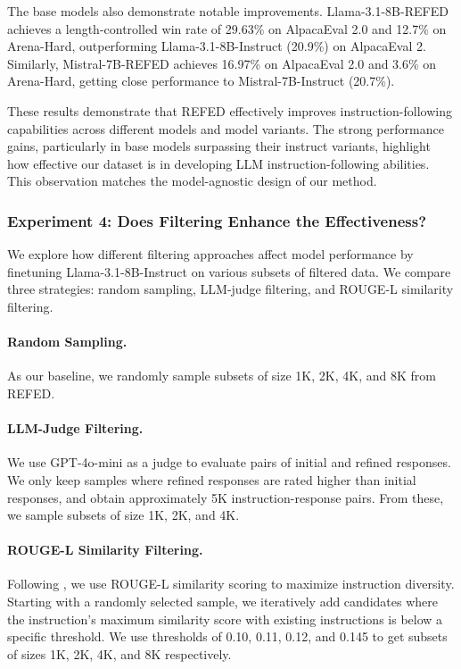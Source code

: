 The base models also demonstrate notable improvements. Llama-3.1-8B-\textsc{REFED} achieves a length-controlled win rate of 29.63\% on AlpacaEval 2.0 and 12.7\% on Arena-Hard, outperforming Llama-3.1-8B-Instruct (20.9\%) on AlpacaEval 2. Similarly, Mistral-7B-\textsc{REFED} achieves 16.97\% on AlpacaEval 2.0 and 3.6\% on Arena-Hard, getting close performance to Mistral-7B-Instruct (20.7\%). 


These results demonstrate that \textsc{REFED} effectively improves instruction-following capabilities across different models and model variants. The strong performance gains, particularly in base models surpassing their instruct variants, highlight how effective our dataset is in developing LLM instruction-following abilities. This observation matches the model-agnostic design of our method.


\subsubsection{Experiment 4: Does Filtering Enhance the Effectiveness?}

We explore how different filtering approaches affect model performance by finetuning Llama-3.1-8B-Instruct on various subsets of filtered data. We compare three strategies: random sampling, LLM-judge filtering, and ROUGE-L similarity filtering.
\paragraph{Random Sampling.}
As our baseline, we randomly sample subsets of size 1K, 2K, 4K, and 8K from \textsc{REFED}. 
\paragraph{LLM-Judge Filtering.}
We use GPT-4o-mini as a judge to evaluate pairs of initial and refined responses. We only keep samples where refined responses are rated higher than initial responses, and obtain approximately 5K instruction-response pairs. From these, we sample subsets of size 1K, 2K, and 4K.
\paragraph{ROUGE-L Similarity Filtering.}
Following \citet{wang-etal-2023-self-instruct}, we use ROUGE-L similarity scoring to maximize instruction diversity. Starting with a randomly selected sample, we iteratively add candidates where the instruction's maximum similarity score with existing instructions is below a specific threshold. We use thresholds of 0.10, 0.11, 0.12, and 0.145 to get subsets of sizes 1K, 2K, 4K, and 8K respectively.


